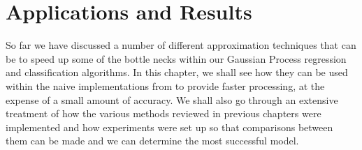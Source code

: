 \section{Applications and Results}\label{Chapter5}

So far we have discussed a number of different approximation techniques that can be to speed up some of the bottle necks within our Gaussian Process regression and classification algorithms. In this chapter, we shall see how they can be used within the naive implementations from  to provide faster processing, at the expense of a small amount of accuracy. We shall also go through an extensive treatment of how the various methods reviewed in previous chapters were implemented and how experiments were set up so that comparisons between them can be made and we can determine the most successful model.







